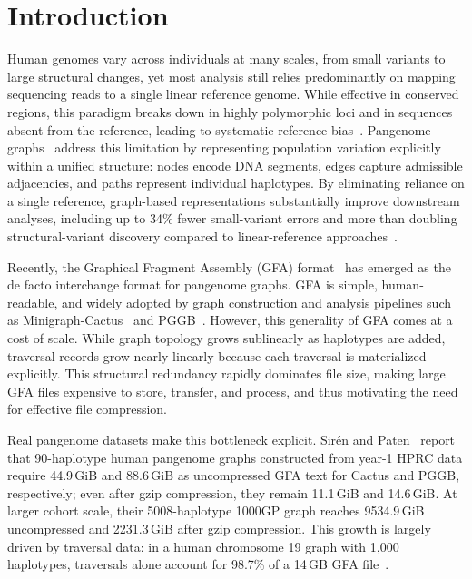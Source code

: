 \section{Introduction}\label{sec:intro}

Human genomes vary across individuals at many scales, from small variants to large structural changes, yet most analysis still relies predominantly on mapping sequencing reads to a single linear reference genome. While effective in conserved regions, this paradigm breaks down in highly polymorphic loci and in sequences absent from the reference, leading to systematic reference bias~\cite{lin2024measuring}. Pangenome graphs~\cite{eizenga2020pangenome, secomandi2025pangenome} address this limitation by representing population variation explicitly within a unified structure: nodes encode DNA segments, edges capture admissible adjacencies, and paths represent individual haplotypes. By eliminating reliance on a single reference, graph-based representations substantially improve downstream analyses, including up to 34\% fewer small-variant errors and more than doubling structural-variant discovery compared to linear-reference approaches~\cite{liao2023draft}.

Recently, the Graphical Fragment Assembly (GFA) format~\cite{gfaspec} has emerged as the de facto interchange format for pangenome graphs. GFA is simple, human-readable, and widely adopted by graph construction and analysis pipelines such as Minigraph-Cactus~\cite{hickey2024pangenome} and PGGB~\cite{garrison2024building}. However, this generality of GFA comes at a cost of scale. While graph topology grows sublinearly as haplotypes are added, traversal records grow nearly linearly because each traversal is materialized explicitly. This structural redundancy rapidly dominates file size, making large GFA files expensive to store, transfer, and process, and thus motivating the need for effective file compression.

Real pangenome datasets make this bottleneck explicit. Sirén and Paten~\cite{siren2022gbz} report that 90-haplotype human pangenome graphs constructed from year-1 HPRC data require 44.9\,GiB and 88.6\,GiB as uncompressed GFA text for Cactus and PGGB, respectively; even after gzip compression, they remain 11.1\,GiB and 14.6\,GiB. At larger cohort scale, their 5008-haplotype 1000GP graph reaches 9534.9\,GiB uncompressed and 2231.3\,GiB after gzip compression. This growth is largely driven by traversal data: in a human chromosome 19 graph with 1{,}000 haplotypes, traversals alone account for 98.7\% of a 14\,GB GFA file~\cite{heringer2025human}.

